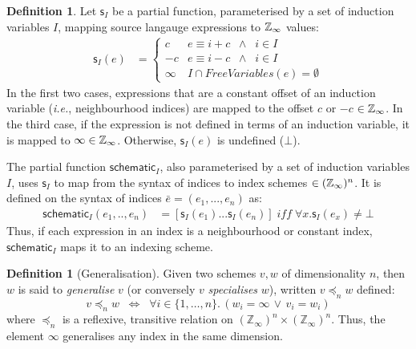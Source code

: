 \documentclass[10pt,preprint]{sigplanconf}
\newcounter{block}
\theoremstyle{definition}
\newtheorem{definition}[block]{Definition}
\newcommand{\ie}{\emph{i.e.}}
\begin{document}
\newcommand{\schemeOne}{\textsf{s}_I}
\newcommand{\schemeN}{\textsf{schematic}_I}
\begin{definition}%
\label{def:schematic}
Let $\schemeOne$ be a partial function, parameterised by a set of
induction variables $I$, mapping source langauge expressions to
$\mathbb{Z}_\infty$ values:
\begin{align*}
\schemeOne(e)
 & =  \begin{cases}
c & e \equiv i + c \;\; \wedge \;\; i \in I \\
-c & e \equiv i - c \;\; \wedge \;\; i \in I \\
\infty & \textit{$I \cap \textit{FreeVariables}(e) = \emptyset $} %
\end{cases}
\end{align*}
In the
first two cases, expressions that are a constant offset of an
induction variable (\ie{}, neighbourhood indices) are mapped to the
offset $c$ or $-c$ $\in \mathbb{Z}_\infty$. In the third case, if the
expression is not defined in terms of an induction variable, it
is mapped to $\infty \in \mathbb{Z}_\infty{}$. Otherwise, $\schemeOne(e)$
is undefined ($\bot$).

The partial function $\schemeN$, also parameterised by a set of
induction variables $I$, uses $\schemeOne$ to
 map from the syntax of indices to index schemes
$\in (\mathbb{Z}_\infty)^n$. It is defined on the syntax of indices $\bar{e} = (e_1, ..., e_n)$ as:
\begin{align*}
\schemeN(e_1, .., e_n) & =
[\schemeOne(e_1) ... \schemeOne(e_n) ]
\; \textit{iff} \; \forall x . \schemeOne(e_x) \neq \bot
\end{align*}
%
Thus, if each expression in an index is a neighbourhood or constant
index, $\schemeN$ maps it to an indexing scheme.
\end{definition}

\begin{definition}[Generalisation]
Given two schemes $v, w$ of dimensionality $n$,
then $w$ is said to \emph{generalise} $v$
(or conversely $v$ \emph{specialises} $w$),
written $v \preceq_n w$ defined:
\[
v \preceq_n w \;\; \Leftrightarrow  \;\;
  \forall i\!\in\!\{ 1, \ldots, n \} . \, (w_i = \infty \, \vee \, v_i = w_i)
\]
where $\preceq_n$ is a reflexive, transitive relation on
$(\mathbb{Z}_{\infty})^n \times (\mathbb{Z}_{\infty})^n$. Thus, the
element $\infty$ generalises any index in the same dimension.
%
\end{definition}
\end{document}
